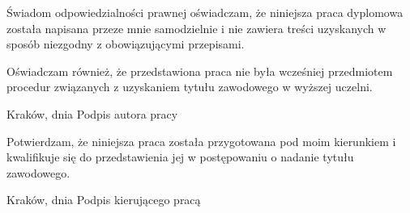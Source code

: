 
\bigskip 
\noindent Świadom odpowiedzialności prawnej oświadczam, że niniejsza praca dyplomowa została napisana przeze mnie samodzielnie i nie zawiera treści uzyskanych w sposób niezgodny z obowiązującymi przepisami.

\bigskip 
\noindent Oświadczam również, że przedstawiona praca nie była wcześniej przedmiotem procedur związanych z uzyskaniem tytułu zawodowego w wyższej uczelni.
\vspace{2cm}

\noindent Kraków, dnia \hfill Podpis autora pracy

\vspace{4cm}


\bigskip 
\noindent Potwierdzam, że niniejsza praca została przygotowana pod moim kierunkiem i kwalifikuje się do przedstawienia jej w postępowaniu o nadanie tytułu zawodowego.
\vspace{2cm}

\noindent Kraków, dnia \hfill Podpis kierującego pracą
\thispagestyle{empty}
